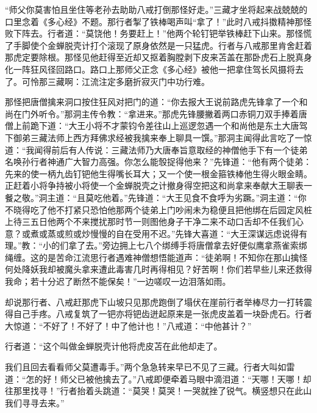 \documentclass[12pt,UTF8]{ctexbook}
\begin{document}
“师父你莫害怕且坐住等老孙去助助八戒打倒那怪好走。”三藏才坐将起来战兢兢的口里念着《多心经》不题。那行者掣了铁棒喝声叫“拿了！”此时八戒抖擞精神那怪败下阵去。行者道：“莫饶他！务要赶上！”他两个轮钉钯举铁棒赶下山来。那怪慌了手脚使个金蝉脱壳计打个滚现了原身依然是一只猛虎。行者与八戒那里肯舍赶着那虎定要除根。那怪见他赶得至近却又抠着胸膛剥下皮来苫盖在那卧虎石上脱真身化一阵狂风径回路口。路口上那师父正念《多心经》被他一把拿住驾长风摄将去了。可怜那三藏啊：江流注定多磨折寂灭门中功行难。

那怪把唐僧擒来洞口按住狂风对把门的道：“你去报大王说前路虎先锋拿了一个和尚在门外听令。”那洞主传令教：“拿进来。”那虎先锋腰撇着两口赤铜刀双手捧着唐僧上前跪下道：“大王小将不才蒙钧令差往山上巡逻忽遇一个和尚他是东土大唐驾下御弟三藏法师上西方拜佛求经被我擒来奉上聊具一馔。”那洞主闻得此言吃了一惊道：“我闻得前后有人传说：三藏法师乃大唐奉旨意取经的神僧他手下有一个徒弟名唤孙行者神通广大智力高强。你怎么能彀捉得他来？”先锋道：“他有两个徒弟：先来的使一柄九齿钉钯他生得嘴长耳大；又一个使一根金箍铁棒他生得火眼金睛。正赶着小将争持被小将使一个金蝉脱壳之计撤身得空把这和尚拿来奉献大王聊表一餐之敬。”洞主道：“且莫吃他着。”先锋道：“大王见食不食呼为劣蹶。”洞主道：“你不晓得吃了他不打紧只恐怕他那两个徒弟上门吵闹未为稳便且把他绑在后园定风桩上待三五日他两个不来搅扰那时节一则图他身子干净二来不动口舌却不任我们心意？或煮或蒸或煎或炒慢慢的自在受用不迟。”先锋大喜道：“大王深谋远虑说得有理。”教：“小的们拿了去。”旁边拥上七八个绑缚手将唐僧拿去好便似鹰拿燕雀索绑绳缠。这的是苦命江流思行者遇难神僧想悟能道声：“徒弟啊！不知你在那山擒怪何处降妖我却被魔头拿来遭此毒害几时再得相见？好苦啊！你们若早些儿来还救得我命；若十分迟了断然不能保矣！”一边嗟叹一边泪落如雨。

却说那行者、八戒赶那虎下山坡只见那虎跑倒了塌伏在崖前行者举棒尽力一打转震得自己手疼。八戒复筑了一钯亦将钯齿迸起原来是一张虎皮盖着一块卧虎石。行者大惊道：“不好了！不好了！中了他计也！”八戒道：“中他甚计？”

行者道：“这个叫做金蝉脱壳计他将虎皮苫在此他却走了。

我们且回去看看师父莫遭毒手。”两个急急转来早已不见了三藏。行者大叫如雷道：“怎的好！师父已被他擒去了。”八戒即便牵着马眼中滴泪道：“天哪！天哪！却往那里找寻！”行者抬着头跳道：“莫哭！莫哭！一哭就挫了锐气。横竖想只在此山我们寻寻去来。”
\end{document}
